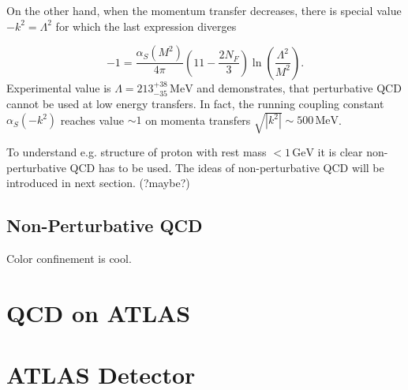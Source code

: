 \documentclass[a4paper,11pt]{report}
\newcommand{\GeV}{\,\text{GeV}}
\newcommand{\MeV}{\,\text{MeV}}
\begin{document}
On the other hand, when the momentum transfer decreases, there is special value
$-k^2=\Lambda^2$ for which the last expression diverges

\begin{equation}
  -1 = \frac{\alpha_S(M^2)}{4\pi} \left( 11 - \frac{2N_F}{3} \right)
  \ln \left( \frac{\Lambda^2}{M^2} \right).
  \label{eq:RunningLambda}
\end{equation}
Experimental value is $\Lambda=213^{+38}_{-35}\MeV$ \cite{wiki:QCDHistory} and demonstrates, that
perturbative QCD cannot be used at low energy transfers. In fact, the running
coupling constant $\alpha_S(-k^2)$ reaches value $\sim 1$ on momenta
transfers $\sqrt{\left| k^2 \right|} \sim 500\MeV$.

To understand e.g. structure of proton with rest mass $< 1\GeV$ it is clear
non-perturbative QCD has to be used. The ideas of non-perturbative QCD will be
introduced in next section. (?maybe?)

\section{Non-Perturbative QCD}
Color confinement is cool.

\chapter{QCD on ATLAS}

\chapter{ATLAS Detector}
\label{ch:intro}


\clearpage
\listoffigures
{}


\clearpage
\listoftables
{}



\clearpage


\end{document}
